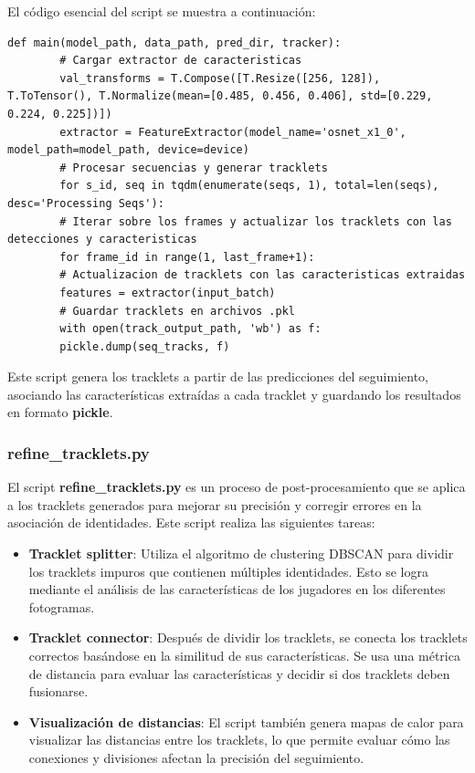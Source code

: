 \documentclass[12pt, a4paper, twoside]{article}
\begin{document}
	El código esencial del script se muestra a continuación:
	
	\begin{lstlisting}[style=pythonstyle]
		def main(model_path, data_path, pred_dir, tracker):
		# Cargar extractor de caracteristicas
		val_transforms = T.Compose([T.Resize([256, 128]), T.ToTensor(), T.Normalize(mean=[0.485, 0.456, 0.406], std=[0.229, 0.224, 0.225])])
		extractor = FeatureExtractor(model_name='osnet_x1_0', model_path=model_path, device=device)
		# Procesar secuencias y generar tracklets
		for s_id, seq in tqdm(enumerate(seqs, 1), total=len(seqs), desc='Processing Seqs'):
		# Iterar sobre los frames y actualizar los tracklets con las detecciones y caracteristicas
		for frame_id in range(1, last_frame+1):
		# Actualizacion de tracklets con las caracteristicas extraidas
		features = extractor(input_batch)
		# Guardar tracklets en archivos .pkl
		with open(track_output_path, 'wb') as f:
		pickle.dump(seq_tracks, f)
	\end{lstlisting}
	
	Este script genera los tracklets a partir de las predicciones del seguimiento, asociando las características extraídas a cada tracklet y guardando los resultados en formato \textbf{pickle}.
	
	\subsubsection{refine\_tracklets.py}
	
	El script \textbf{refine\_tracklets.py} es un proceso de post-procesamiento que se aplica a los tracklets generados para mejorar su precisión y corregir errores en la asociación de identidades. Este script realiza las siguientes tareas:
	
	\begin{itemize}
		\item \textbf{Tracklet splitter}: Utiliza el algoritmo de clustering DBSCAN para dividir los tracklets impuros que contienen múltiples identidades. Esto se logra mediante el análisis de las características de los jugadores en los diferentes fotogramas.
		\item \textbf{Tracklet connector}: Después de dividir los tracklets, se conecta los tracklets correctos basándose en la similitud de sus características. Se usa una métrica de distancia para evaluar las características y decidir si dos tracklets deben fusionarse.
		\item \textbf{Visualización de distancias}: El script también genera mapas de calor para visualizar las distancias entre los tracklets, lo que permite evaluar cómo las conexiones y divisiones afectan la precisión del seguimiento.
	\end{itemize}
	
\end{document}
